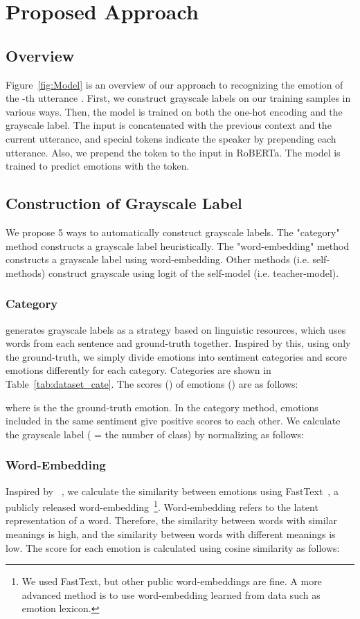 \documentclass[a4paper]{article}
\begin{document}
\section{Proposed Approach}
\subsection{Overview}
Figure~\ref{fig:Model} is an overview of our approach to recognizing the emotion of the -th utterance . First, we construct grayscale labels on our training samples in various ways. Then, the model is trained on both the one-hot encoding and the grayscale label. The input is concatenated with the previous context and the current utterance, and special tokens indicate the speaker by prepending each utterance. Also, we prepend the  token to the input in RoBERTa. The model is trained to predict emotions with the  token.


\subsection{Construction of Grayscale Label}
\label{sec:grayscale}
We propose 5 ways to automatically construct grayscale labels. The "category" method constructs a grayscale label heuristically. The "word-embedding" method constructs a grayscale label using word-embedding. Other methods (i.e. self-methods) construct grayscale using logit of the self-model (i.e. teacher-model).


\subsubsection{Category}
\cite{ijcai2018-639} generates grayscale labels as a strategy based on linguistic resources, which uses words from each sentence and ground-truth together. Inspired by this, using only the ground-truth, we simply divide emotions into sentiment categories and score emotions differently for each category. Categories are shown in Table~\ref{tab:dataset_cate}. The scores () of emotions () are as follows:






where  is the the ground-truth emotion. In the category method, emotions included in the same sentiment give positive scores to each other. We calculate the grayscale label  ( = the number of class) by normalizing  as follows:


\subsubsection{Word-Embedding}
Inspired by ~\cite{li2021word}, we calculate the similarity between emotions using FastText~\cite{mikolov2018advances}, a publicly released word-embedding~\footnote{We used FastText, but other public word-embeddings are fine. A more advanced method is to use word-embedding learned from data such as emotion lexicon.}. Word-embedding refers to the latent representation of a word. Therefore, the similarity between words with similar meanings is high, and the similarity between words with different meanings is low. The score for each emotion is calculated using cosine similarity as follows:
\end{document}
